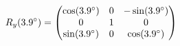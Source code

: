 \documentclass[preview]{standalone}
\begin{document}
\begin{align*}
\special{dvisvgm:raw <g id='unique000'>}R_y(3.9^\circ) = \begin{pmatrix} \cos(3.9^\circ) & 0 & -\sin(3.9^\circ) \\ 0 & 1 & 0 \\ \sin(3.9^\circ) & 0 & \cos(3.9^\circ) \end{pmatrix}\special{dvisvgm:raw </g>}
\end{align*}
\end{document}
